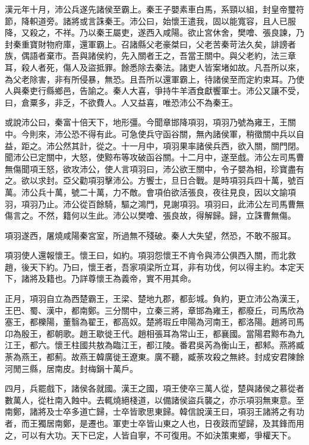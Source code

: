 漢元年十月，沛公兵遂先諸侯至霸上。秦王子嬰素車白馬，系頸以組，封皇帝璽符節，降軹道旁。諸將或言誅秦王。沛公曰，始懷王遣我，固以能寬容，且人已服降，又殺之，不祥。乃以秦王屬吏，遂西入咸陽。欲止宮休舍，樊噲、張良諫，乃封秦重寶財物府庫，還軍霸上。召諸縣父老豪桀曰，父老苦秦苛法久矣，誹謗者族，偶語者棄市。吾與諸侯約，先入關者王之，吾當王關中。與父老約，法三章耳，殺人者死，傷人及盜抵罪。餘悉除去秦法。諸吏人皆案堵如故。凡吾所以來，為父老除害，非有所侵暴，無恐。且吾所以還軍霸上，待諸侯至而定約束耳。乃使人與秦吏行縣鄉邑，告諭之。秦人大喜，爭持牛羊酒食獻饗軍士。沛公又讓不受，曰，倉粟多，非乏，不欲費人。人又益喜，唯恐沛公不為秦王。

或說沛公曰，秦富十倍天下，地形彊。今聞章邯降項羽，項羽乃號為雍王，王關中。今則來，沛公恐不得有此。可急使兵守函谷關，無內諸侯軍，稍徵關中兵以自益，距之。沛公然其計，從之。十一月中，項羽果率諸侯兵西，欲入關，關門閉。聞沛公已定關中，大怒，使黥布等攻破函谷關。十二月中，遂至戲。沛公左司馬曹無傷聞項王怒，欲攻沛公，使人言項羽曰，沛公欲王關中，令子嬰為相，珍寶盡有之。欲以求封。亞父勸項羽擊沛公。方饗士，旦日合戰。是時項羽兵四十萬，號百萬。沛公兵十萬，號二十萬，力不敵。會項伯欲活張良，夜往見良，因以文諭項羽，項羽乃止。沛公從百餘騎，驅之鴻門，見謝項羽。項羽曰，此沛公左司馬曹無傷言之。不然，籍何以生此。沛公以樊噲、張良故，得解歸。歸，立誅曹無傷。

項羽遂西，屠燒咸陽秦宮室，所過無不殘破。秦人大失望，然恐，不敢不服耳。

項羽使人還報懷王。懷王曰，如約。項羽怨懷王不肯令與沛公俱西入關，而北救趙，後天下約。乃曰，懷王者，吾家項梁所立耳，非有功伐，何以得主約。本定天下，諸將及籍也。乃詳尊懷王為義帝，實不用其命。

正月，項羽自立為西楚霸王，王梁、楚地九郡，都彭城。負約，更立沛公為漢王，王巴、蜀、漢中，都南鄭。三分關中，立秦三將，章邯為雍王，都廢丘，司馬欣為塞王，都櫟陽，董翳為翟王，都高奴。楚將瑕丘申陽為河南王，都洛陽。趙將司馬卬為殷王，都朝歌。趙王歇徙王代。趙相張耳為常山王，都襄國。當陽君黥布為九江王，都六。懷王柱國共敖為臨江王，都江陵。番君吳芮為衡山王，都邾。燕將臧荼為燕王，都薊。故燕王韓廣徙王遼東。廣不聽，臧荼攻殺之無終。封成安君陳餘河閒三縣，居南皮。封梅鋗十萬戶。

四月，兵罷戲下，諸侯各就國。漢王之國，項王使卒三萬人從，楚與諸侯之慕從者數萬人，從杜南入蝕中。去輒燒絕棧道，以備諸侯盜兵襲之，亦示項羽無東意。至南鄭，諸將及士卒多道亡歸，士卒皆歌思東歸。韓信說漢王曰，項羽王諸將之有功者，而王獨居南鄭，是遷也。軍吏士卒皆山東之人也，日夜跂而望歸，及其鋒而用之，可以有大功。天下已定，人皆自寧，不可復用。不如決策東鄉，爭權天下。

